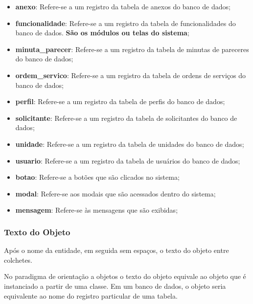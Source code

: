 	\begin{itemize}
		\item \textbf{anexo}: Refere-se a um registro da tabela de anexos do banco de dados;

		\item \textbf{funcionalidade}: Refere-se a um registro da tabela de funcionalidades do banco de dados. \textbf{São os módulos ou telas do sistema};

		\item \textbf{minuta\_parecer}: Refere-se a um registro da tabela de minutas de pareceres do banco de dados;

		\item \textbf{ordem\_servico}: Refere-se a um registro da tabela de ordens de serviços do banco de dados;

		\item \textbf{perfil}: Refere-se a um registro da tabela de perfis do banco de dados;

		\item \textbf{solicitante}: Refere-se a um registro da tabela de solicitantes do banco de dados;

		\item \textbf{unidade}: Refere-se a um registro da tabela de unidades do banco de dados;

		\item \textbf{usuario}: Refere-se a um registro da tabela de usuários do banco de dados;

		\item \textbf{botao}: Refere-se a botões que são clicados no sistema;
		 		
		\item \textbf{modal}: Refere-se aos modais que são acessados dentro do sistema;
		
		\item \textbf{mensagem}: Refere-se às mensagens que são exibidas;
		
	\end{itemize}



\subsubsection{Texto do Objeto}
	Após o nome da entidade, em seguida sem espaços, o texto do objeto entre colchetes. 
	
	No paradigma de orientação a objetos o texto do objeto equivale ao objeto que é instanciado a partir de uma classe. Em um banco de dados, o objeto seria equivalente ao nome do registro particular de uma tabela. 
	
